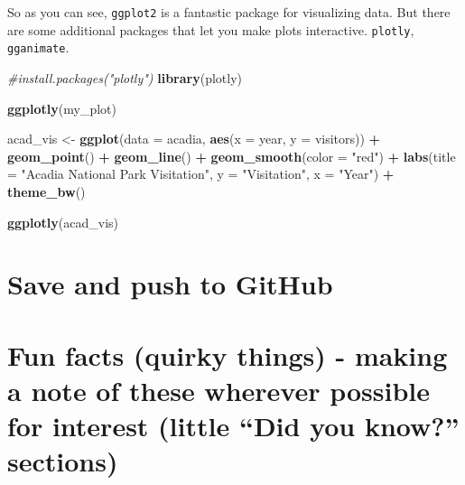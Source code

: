 \documentclass[]{book}
\newenvironment{Shaded}{\begin{snugshade}}{\end{snugshade}}
\newcommand{\CommentTok}[1]{\textcolor[rgb]{0.56,0.35,0.01}{\textit{#1}}}
\newcommand{\DataTypeTok}[1]{\textcolor[rgb]{0.13,0.29,0.53}{#1}}
\newcommand{\KeywordTok}[1]{\textcolor[rgb]{0.13,0.29,0.53}{\textbf{#1}}}
\newcommand{\NormalTok}[1]{#1}
\newcommand{\OperatorTok}[1]{\textcolor[rgb]{0.81,0.36,0.00}{\textbf{#1}}}
\newcommand{\StringTok}[1]{\textcolor[rgb]{0.31,0.60,0.02}{#1}}
\begin{document}
So as you can see, \texttt{ggplot2} is a fantastic package for visualizing data. But there are some additional packages that let you make plots interactive. \texttt{plotly}, \texttt{gganimate}.

\begin{Shaded}
\begin{Highlighting}[]
\CommentTok{#install.packages("plotly")}
\KeywordTok{library}\NormalTok{(plotly)}

\KeywordTok{ggplotly}\NormalTok{(my_plot)}
\end{Highlighting}
\end{Shaded}

\begin{Shaded}
\begin{Highlighting}[]
\NormalTok{acad_vis <-}\StringTok{ }\KeywordTok{ggplot}\NormalTok{(}\DataTypeTok{data =}\NormalTok{ acadia, }\KeywordTok{aes}\NormalTok{(}\DataTypeTok{x =}\NormalTok{ year, }\DataTypeTok{y =}\NormalTok{ visitors)) }\OperatorTok{+}\StringTok{ }
\StringTok{  }\KeywordTok{geom_point}\NormalTok{() }\OperatorTok{+}
\StringTok{  }\KeywordTok{geom_line}\NormalTok{() }\OperatorTok{+}
\StringTok{  }\KeywordTok{geom_smooth}\NormalTok{(}\DataTypeTok{color =} \StringTok{"red"}\NormalTok{) }\OperatorTok{+}
\StringTok{  }\KeywordTok{labs}\NormalTok{(}\DataTypeTok{title =} \StringTok{"Acadia National Park Visitation"}\NormalTok{,}
       \DataTypeTok{y =} \StringTok{"Visitation"}\NormalTok{,}
       \DataTypeTok{x =} \StringTok{"Year"}\NormalTok{) }\OperatorTok{+}
\StringTok{  }\KeywordTok{theme_bw}\NormalTok{()}

\KeywordTok{ggplotly}\NormalTok{(acad_vis)}
\end{Highlighting}
\end{Shaded}

\hypertarget{save-and-push-to-github}{%
\section{Save and push to GitHub}\label{save-and-push-to-github}}

\hypertarget{fun-facts-quirky-things---making-a-note-of-these-wherever-possible-for-interest-little-did-you-know-sections-2}{%
\section{Fun facts (quirky things) - making a note of these wherever possible for interest (little ``Did you know?'' sections)}\label{fun-facts-quirky-things---making-a-note-of-these-wherever-possible-for-interest-little-did-you-know-sections-2}}
\end{document}

